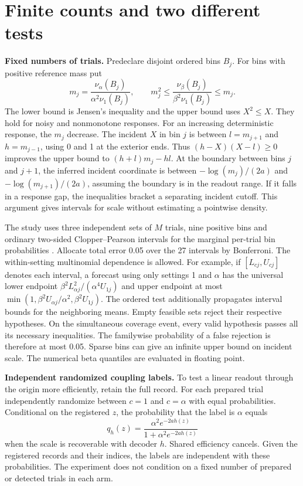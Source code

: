 \section{Finite counts and two different tests}
\textbf{Fixed numbers of trials.} Predeclare disjoint ordered bins $B_j$. For bins with positive reference mass put
\[
 m_j=\frac{\nu_\alpha(B_j)}{\alpha^2\nu_1(B_j)},\qquad
 m_j^2\le\frac{\nu_\beta(B_j)}{\beta^2\nu_1(B_j)}\le m_j .
\]
The lower bound is Jensen's inequality and the upper bound uses $X^2\le X$. They hold for noisy and nonmonotone responses. For an increasing deterministic response, the $m_j$ decrease. The incident $X$ in bin $j$ is between $l=m_{j+1}$ and $h=m_{j-1}$, using 0 and 1 at the exterior ends. Thus $(h-X)(X-l)\ge0$ improves the upper bound to $(h+l)m_j-hl$. At the boundary between bins $j$ and $j+1$, the inferred incident coordinate is between $-\log(m_j)/(2a)$ and $-\log(m_{j+1})/(2a)$, assuming the boundary is in the readout range. If it falls in a response gap, the inequalities bracket a separating incident cutoff. This argument gives intervals for scale without estimating a pointwise density.

The study uses three independent sets of $M$ trials, nine positive bins and ordinary two-sided Clopper--Pearson intervals for the marginal per-trial bin probabilities \cite{clopper}. Allocate total error 0.05 over the 27 intervals by Bonferroni. The within-setting multinomial dependence is allowed. For example, if $[L_{cj},U_{cj}]$ denotes each interval, a forecast using only settings 1 and $\alpha$ has the universal lower endpoint $\beta^2L_{\alpha j}^2/(\alpha^4U_{1j})$ and upper endpoint at most $\min(1,\beta^2U_{\alpha j}/\alpha^2,\beta^2U_{1j})$. The ordered test additionally propagates interval bounds for the neighboring means. Empty feasible sets reject their respective hypotheses. On the simultaneous coverage event, every valid hypothesis passes all its necessary inequalities. The familywise probability of a false rejection is therefore at most 0.05. Sparse bins can give an infinite upper bound on incident scale. The numerical beta quantiles are evaluated in floating point.

\textbf{Independent randomized coupling labels.} To test a linear readout through the origin more efficiently, retain the full record. For each prepared trial independently randomize between $c=1$ and $c=\alpha$ with equal probabilities. Conditional on the registered $z$, the probability that the label is $\alpha$ equals
\[
 q_h(z)=\frac{\alpha^2 e^{-2a h(z)}}{1+\alpha^2 e^{-2a h(z)}}
\]
when the scale is recoverable with decoder $h$. Shared efficiency cancels. Given the registered records and their indices, the labels are independent with these probabilities. The experiment does not condition on a fixed number of prepared or detected trials in each arm.


